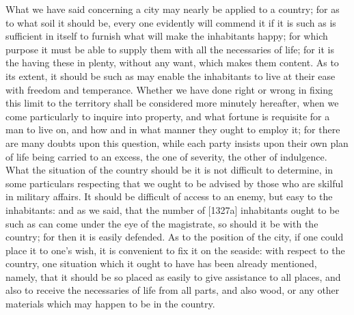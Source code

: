 
What we have said concerning a city may nearly be applied to a country;
for as to what soil it should be, every one evidently will commend it if
it is such as is sufficient in itself to furnish what will make the
inhabitants happy; for which purpose it must be able to supply them with
all the necessaries of life; for it is the having these in plenty, without
any want, which makes them content. As to its extent, it should be such as
may enable the inhabitants to live at their ease with freedom and
temperance. Whether we have done right or wrong in fixing this limit to
the territory shall be considered more minutely hereafter, when we come
particularly to inquire into property, and what fortune is requisite for a
man to live on, and how and in what manner they ought to employ it; for
there are many doubts upon this question, while each party insists upon
their own plan of life being carried to an excess, the one of severity,
the other of indulgence. What the situation of the country should be it is
not difficult to determine, in some particulars respecting that we ought
to be advised by those who are skilful in military affairs. It should be
difficult of access to an enemy, but easy to the inhabitants: and as we
said, that the number of [1327a] inhabitants ought to be such as can come
under the eye of the magistrate, so should it be with the country; for
then it is easily defended. As to the position of the city, if one could
place it to one's wish, it is convenient to fix it on the seaside: with
respect to the country, one situation which it ought to have has been
already mentioned, namely, that it should be so placed as easily to give
assistance to all places, and also to receive the necessaries of life from
all parts, and also wood, or any other materials which may happen to be in
the country.


